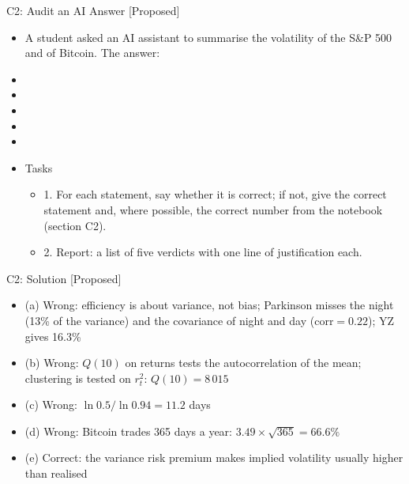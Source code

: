 \begin{frame}{C2: Audit an AI Answer [Proposed]}
\itemsize{\scriptsize}
\begin{itemize}
    \item A student asked an AI assistant to summarise the volatility of the S\&P 500 and of Bitcoin. The answer:
    \item {}
    \item {}
    \item {}
    \item {}
    \item {}
    \item Tasks
    \begin{itemize}
        \item 1. For each statement, say whether it is correct; if not, give the correct statement and, where possible, the correct number from the notebook (section C2).
        \item 2. Report: a list of five verdicts with one line of justification each.
    \end{itemize}
\end{itemize}
\end{frame}

\ifsolutions
\begin{frame}{C2: Solution [Proposed]}
\itemsize{\footnotesize}
\begin{itemize}
    \item (a) Wrong: efficiency is about variance, not bias; Parkinson misses the night (13\% of the variance) and the covariance of night and day ($\mathrm{corr} = 0.22$); YZ gives 16.3\%
    \item (b) Wrong: $Q(10)$ on returns tests the autocorrelation of the mean; clustering is tested on $r_t^2$: $Q(10) = 8\,015$
    \item (c) Wrong: $\ln 0.5/\ln 0.94 = 11.2$ days
    \item (d) Wrong: Bitcoin trades 365 days a year: $3.49 \times \sqrt{365} = 66.6\%$
    \item (e) Correct: the variance risk premium makes implied volatility usually higher than realised
\end{itemize}
\end{frame}
\fi


